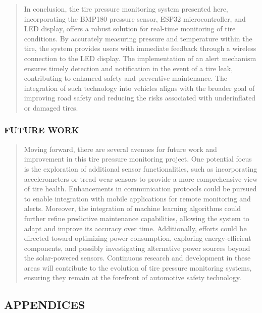 \documentclass[
]{article}
\begin{document}
\begin{quote}
In conclusion, the tire pressure monitoring system presented here,
incorporating the BMP180 pressure sensor, ESP32 microcontroller, and LED
display, offers a robust solution for real-time monitoring of tire
conditions. By accurately measuring pressure and temperature within the
tire, the system provides users with immediate feedback through a
wireless connection to the LED display. The implementation of an alert
mechanism ensures timely detection and notification in the event of a
tire leak, contributing to enhanced safety and preventive maintenance.
The integration of such technology into vehicles aligns with the broader
goal of improving road safety and reducing the risks associated with
underinflated or damaged tires.
\end{quote}

\hypertarget{future-work}{%
\subsubsection{FUTURE WORK}\label{future-work}}

\begin{quote}
Moving forward, there are several avenues for future work and
improvement in this tire pressure monitoring project. One potential
focus is the exploration of additional sensor functionalities, such as
incorporating accelerometers or tread wear sensors to provide a more
comprehensive view of tire health. Enhancements in communication
protocols could be pursued to enable integration with mobile
applications for remote monitoring and alerts. Moreover, the integration
of machine learning algorithms could further refine predictive
maintenance capabilities, allowing the system to adapt and improve its
accuracy over time. Additionally, efforts could be directed toward
optimizing power consumption, exploring energy-efficient components, and
possibly investigating alternative power sources beyond the
solar-powered sensors. Continuous research and development in these
areas will contribute to the evolution of tire pressure monitoring
systems, ensuring they remain at the forefront of automotive safety
technology.
\end{quote}
\newpage
\hypertarget{appendices}{%
\subsection{APPENDICES}\label{appendices}}
\end{document}
